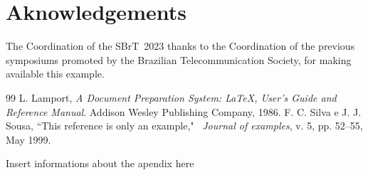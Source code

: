 \documentclass[english]{sbrt}
\begin{document}
\section*{Aknowledgements}
The Coordination of the SBrT~2023 thanks to the Coordination of the previous symposiums promoted by the Brazilian Telecommunication Society, for making available this example.

\begin{thebibliography}{99}
 L. Lamport, \textit{A Document Preparation System: \LaTeX, User's
Guide and Reference Manual}. Addison Wesley Publishing Company,
1986.
 F. C. Silva e J. J. Sousa, ``This reference is only an example," ~\textit{Journal of examples}, v. 5, pp. 52--55, May
1999.
\end{thebibliography}


\appendix
Insert informations about the apendix here
\end{document}
